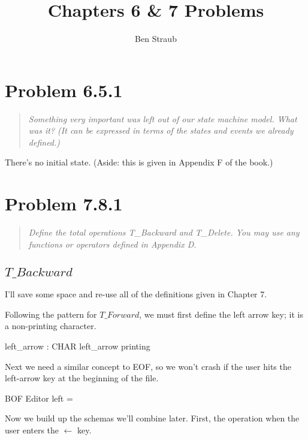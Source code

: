 \documentclass[11pt]{article}
\begin{document}
\title{Chapters 6 \& 7 Problems}
\author{Ben Straub}
\maketitle

\section{Problem 6.5.1}
\begin{quote} \textit{
    Something very important was left out of our state machine model. What was it? (It can be
    expressed in terms of the states and events we already defined.)
  } \end{quote}

There's no initial state. (Aside: this is given in Appendix F of the book.)

\section{Problem 7.8.1}

\begin{quote}
  \textit{Define the total operations T\_Backward and T\_Delete.  You may use any functions or
    operators defined in Appendix D. }
\end{quote}

\subsection{$T\_Backward$}

I'll save some space and re-use all of the definitions given in Chapter 7.

Following the pattern for $T\_Forward$, we must first define the left arrow key; it is a
non-printing character.

\begin{axdef}
  left\_arrow : CHAR
  \where
  left\_arrow \notin printing
\end{axdef}

Next we need a similar concept to EOF, so we won't crash if the user hits the left-arrow key at the
beginning of the file.

\begin{schema}{BOF}
  Editor
  \where
  left = \langle \rangle
\end{schema}

Now we build up the schemas we'll combine later. First, the operation when the user enters the
$\leftarrow$ key.
\end{document}
